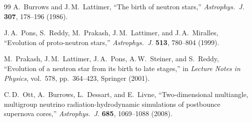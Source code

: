 \begin{thebibliography}{99}
A.~Burrows and J.\,M.~Lattimer,
``The birth of neutron stars,''
\emph{Astrophys.\ J.} \textbf{307}, 178--196 (1986).

J.\,A.~Pons, S.~Reddy, M.~Prakash, J.\,M.~Lattimer, and
J.\,A.~Miralles,
``Evolution of proto-neutron stars,''
\emph{Astrophys.\ J.} \textbf{513}, 780--804 (1999).

M.~Prakash, J.\,M.~Lattimer, J.\,A.~Pons, A.\,W.~Steiner,
and S.~Reddy,
``Evolution of a neutron star from its birth to late stages,''
in \emph{Lecture Notes in Physics}, vol.~578, pp.~364--423,
Springer (2001).

C.\,D.~Ott, A.~Burrows, L.~Dessart, and E.~Livne,
``Two-dimensional multiangle, multigroup neutrino radiation-hydrodynamic
simulations of postbounce supernova cores,''
\emph{Astrophys.\ J.} \textbf{685}, 1069--1088 (2008).
\end{thebibliography}
